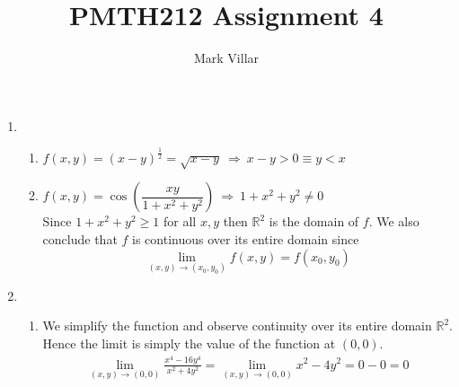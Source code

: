 \documentclass[12pt]{amsart}
\title{PMTH212 Assignment 4}
\author{Mark Villar}
\begin{document}
 

\maketitle 

\begin{enumerate}
	
	\item 
	
		\begin{enumerate}
		
			\item $f(x,y)=(x-y)^{\frac{1}{2}}=\sqrt{x-y} \ \Rightarrow \ x-y>0 \equiv y<x$
									
			\item $f(x,y)=\cos\left(\dfrac{xy}{1+x^2+y^2}\right) \ \Rightarrow \ 1+x^2+y^2\ne0$ \\
					 Since $1+x^2+y^2 \ge1$ for all $x,y$ then $\mathbb{R}^2$ is the domain of $f$. We also conclude that $f$ is continuous over its entire domain since  
					 $$\lim_{(x,y)\rightarrow(x_0,y_0)} f(x,y)=f(x_0,y_0)$$
			
		\end{enumerate}
		
		\medskip
		
	\item
		
		\begin{enumerate}
		
			\item We simplify the function and observe continuity over its entire domain $\mathbb{R}^2$. Hence the limit is simply the value of the function at $(0,0)$.
				\begin{align*}
					\lim_{(x,y) \rightarrow (0,0)} \frac{x^4-16y^4}{x^2+4y^2} = \lim_{(x,y) \rightarrow (0,0)} x^2-4y^2 = 0-0 = 0
				\end{align*}
			
				
			

\end{enumerate}
\end{enumerate}
\end{document}
